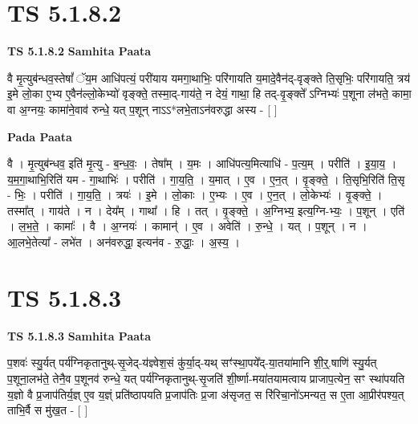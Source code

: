 \documentclass[17pt]{extarticle}
\begin{document}

\section{ TS 5.1.8.2 }

\textbf{TS 5.1.8.2 } \newline
\textbf{Samhita Paata} \newline

वै मृ॒त्युब॑न्धव॒स्तेषां᳚ ॅय॒म आधि॑पत्यं॒ परी॑याय यमगा॒थाभिः॒ परि॑गायति य॒मादे॒वैन॑द्-वृङ्क्ते ति॒सृभिः॒ परि॑गायति॒ त्रय॑ इ॒मे लो॒का ए॒भ्य ए॒वैन॑ल्लो॒केभ्यो॑ वृङ्क्ते॒ तस्मा॒द्-गाय॑ते॒ न देयं॒ गाथा॒ हि तद्-वृ॒ङ्क्ते᳚ ऽग्निभ्यः॑ प॒शूना ल॑भते॒ कामा॒ वा अ॒ग्नयः॒ कामा॑ने॒वाव॑ रुन्धे॒ यत् प॒शून् नाऽऽ*लभे॒ताऽन॑वरुद्धा अस्य - [  ] \newline

\textbf{Pada Paata} \newline

वै । मृ॒त्युब॑न्धव॒ इति॑ मृ॒त्यु - ब॒न्ध॒वः॒ । तेषा᳚म् । य॒मः । आधि॑पत्य॒मित्याधि॑ - प॒त्य॒म् । परीति॑ । इ॒या॒य॒ । य॒म॒गा॒थाभि॒रिति॑ यम - गा॒थाभिः॑ । परीति॑ । गा॒य॒ति॒ । य॒मात् । ए॒व । ए॒न॒त् । वृ॒ङ्क्ते॒ । ति॒सृभि॒रिति॑ ति॒सृ - भिः॒ । परीति॑ । गा॒य॒ति॒ । त्रयः॑ । इ॒मे । लो॒काः । ए॒भ्यः । ए॒व । ए॒न॒त् । लो॒केभ्यः॑ । वृ॒ङ्क्ते॒ । तस्मा᳚त् । गाय॑ते । न । देय᳚म् । गाथा᳚ । हि । तत् । वृ॒ङ्क्ते॒ । अ॒ग्निभ्य॒ इत्य॒ग्नि-भ्यः॒ । प॒शून् । एति॑ । ल॒भ॒ते॒ । कामाः᳚ । वै । अ॒ग्नयः॑ । कामान्॑ । ए॒व । अवेति॑ । रु॒न्धे॒ । यत् । प॒शून् । न । आ॒लभे॒तेत्या᳚ - लभे॑त । अन॑वरुद्धा॒ इत्यन॑व - रु॒द्धाः॒ । अ॒स्य॒ ।  \newline





\section{ TS 5.1.8.3 }

\textbf{TS 5.1.8.3 } \newline
\textbf{Samhita Paata} \newline

प॒शवः॑ स्यु॒र्यत् पर्य॑ग्निकृतानुथ्-सृ॒जेद्-य॑ज्ञ्वेश॒सं कु॑र्या॒द्-यथ् सꣳ॑स्था॒पये᳚द्-या॒तया॑मानि शी॒र्॒.षाणि॑ स्यु॒र्यत् प॒शूना॒लभ॑ते॒ तेनै॒व प॒शूनव॑ रुन्धे॒ यत् पर्य॑ग्निकृतानुथ्-सृ॒जति॑ शी॒र्ष्णा-मया॑तयामत्वाय प्राजाप॒त्येन॒ सꣳ स्था॑पयति य॒ज्ञो वै प्र॒जाप॑तिर्य॒ज्ञ् ए॒व य॒ज्ञ्ं प्रति॑ष्ठापयति प्र॒जाप॑तिः प्र॒जा अ॑सृजत॒ स रि॑रिचा॒नो॑ऽमन्यत॒ स ए॒ता आ॒प्रीर॑पश्य॒त् ताभि॒र्वै स मु॑ख॒त - [  ] \newline
\end{document}
